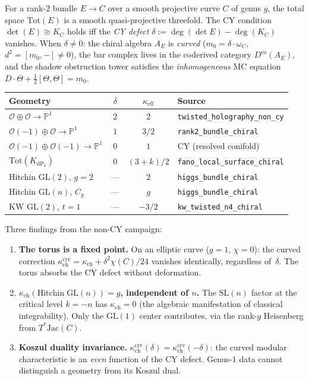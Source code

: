 \documentclass[11pt]{article}
\newcommand{\cO}{\mathcal{O}}
\newcommand{\bP}{\mathbb{P}}
\begin{document}
For a rank-$2$ bundle $E \to C$ over a smooth projective curve $C$ of genus $g$,
the total space $\mathrm{Tot}(E)$ is a smooth quasi-projective threefold. The CY condition
$\det(E) \cong K_C$ holds iff the \emph{CY defect} $\delta := \deg(\det E) - \deg(K_C)$
vanishes. When $\delta \neq 0$: the chiral algebra $A_E$ is \emph{curved}
($m_0 = \delta \cdot \omega_C$, $d^2 = [m_0, -] \neq 0$), the bar complex lives in the
coderived category $D^{\mathrm{co}}(A_E)$, and the shadow obstruction tower satisfies
the \emph{inhomogeneous} MC equation $D \cdot \Theta + \tfrac{1}{2}[\Theta, \Theta] = m_0$.

\begin{center}
\renewcommand{\arraystretch}{1.2}
\small
\begin{tabular}{lccl}
 \toprule
 \textbf{Geometry} & $\delta$ & $\kappa_{\mathrm{eff}}$ & \textbf{Source} \\
 \midrule
 $\cO \oplus \cO \to \bP^1$ & $2$ & $2$ & \texttt{twisted\_holography\_non\_cy} \\
 $\cO(-1) \oplus \cO \to \bP^1$ & $1$ & $3/2$ & \texttt{rank2\_bundle\_chiral} \\
 $\cO(-1) \oplus \cO(-1) \to \bP^1$ & $0$ & $1$ & CY (resolved conifold) \\
 $\mathrm{Tot}(K_{\mathrm{dP}_k})$ & $0$ & $(3+k)/2$ & \texttt{fano\_local\_surface\_chiral} \\
 Hitchin $\mathrm{GL}(2)$, $g = 2$ & --- & $2$ & \texttt{higgs\_bundle\_chiral} \\
 Hitchin $\mathrm{GL}(n)$, $C_g$ & --- & $g$ & \texttt{higgs\_bundle\_chiral} \\
 KW $\mathrm{GL}(2)$, $t = 1$ & --- & $-3/2$ & \texttt{kw\_twisted\_n4\_chiral} \\
 \bottomrule
\end{tabular}
\end{center}

\noindent Three findings from the non-CY campaign:

\begin{enumerate}[label=(\roman*)]
\item \textbf{The torus is a fixed point.}
 On an elliptic curve ($g = 1$, $\chi = 0$): the curved correction
 $\kappa_{\mathrm{ch}}^{\mathrm{crv}} = \kappa_{\mathrm{ch}} + \delta^2 \chi(C)/24$ vanishes identically,
 regardless of~$\delta$. The torus absorbs the CY defect without deformation.

\item \textbf{$\kappa_{\mathrm{ch}}(\mathrm{Hitchin}\;\mathrm{GL}(n)) = g$, independent of $n$.}
 The $\mathrm{SL}(n)$ factor at the critical level $k = -n$ has $\kappa_{\mathrm{ch}} = 0$
 (the algebraic manifestation of classical integrability).
 Only the $\mathrm{GL}(1)$ center contributes, via the rank-$g$ Heisenberg from $T^*\mathrm{Jac}(C)$.

\item \textbf{Koszul duality invariance.}
 $\kappa_{\mathrm{ch}}^{\mathrm{crv}}(\delta) = \kappa_{\mathrm{ch}}^{\mathrm{crv}}(-\delta)$: the curved modular
 characteristic is an \emph{even} function of the CY defect. Genus-$1$ data cannot
 distinguish a geometry from its Koszul dual.
\end{enumerate}
\end{document}
